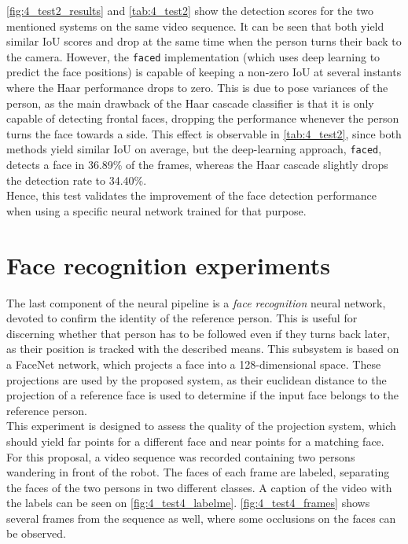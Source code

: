 \autoref{fig:4_test2_results} and \autoref{tab:4_test2} show the detection scores for the two mentioned systems on the same video sequence. It can be seen that both yield similar IoU scores and drop at the same time when the person turns their back to the camera. However, the \texttt{faced} implementation (which uses deep learning to predict the face positions) is capable of keeping a non-zero IoU at several instants where the Haar performance drops to zero.  This is due to pose variances of the person, as the main drawback of the Haar cascade classifier is that it is only capable of detecting frontal faces, dropping the performance whenever the person turns the face towards a side. This effect is observable in \autoref{tab:4_test2}, since both methods yield similar IoU on average, but the deep-learning approach, \texttt{faced}, detects a face in 36.89\% of the frames, whereas the Haar cascade slightly drops the detection rate to 34.40\%.\\

Hence, this test validates the improvement of the face detection performance when using a specific neural network trained for that purpose.




\section{Face recognition experiments}

\label{sec:4_test4}
The last component of the neural pipeline is a \textit{face recognition} neural network, devoted to confirm the identity of the reference person. This is useful for discerning whether that person has to be followed even if they turns back later, as their position is tracked with the described means. This subsystem is based on a FaceNet \cite{facenet} network, which projects a face into a 128-dimensional space. These projections are used by the proposed system, as their euclidean distance to the projection of a reference face is used to determine if the input face belongs to the reference person.\\

This experiment is designed to assess the quality of the projection system, which should yield far points for a different face and near points for a matching face. For this proposal, a video sequence was recorded containing two persons wandering in front of the robot. The faces of each frame are labeled, separating the faces of the two persons in two different classes. A caption of the video with the labels can be seen on \autoref{fig:4_test4_labelme}. \autoref{fig:4_test4_frames} shows several frames from the sequence as well, where some occlusions on the faces can be observed. 

